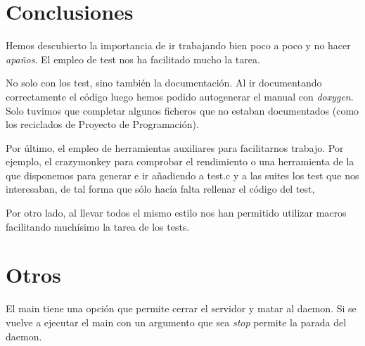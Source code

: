\documentclass[nochap]{apuntes}
\begin{document}
\section{Conclusiones}

Hemos descubierto la importancia de ir trabajando bien poco a poco y no hacer \textit{apaños}. El empleo de test nos ha facilitado mucho la tarea. 

No solo con los test, sino también la documentación. Al ir documentando correctamente el código luego hemos podido autogenerar el manual con \textit{doxygen}. Solo tuvimos que completar algunos ficheros que no estaban documentados (como los reciclados de Proyecto de Programación).

Por último, el empleo de herramientas auxiliares para facilitarnos trabajo. Por ejemplo, el crazymonkey para comprobar el rendimiento o una herramienta de la que disponemos para generar e ir añadiendo a test.c y a las suites los test que nos interesaban, de tal forma que sólo hacía falta rellenar el código del test, 

Por otro lado, al llevar todos el mismo estilo nos han permitido utilizar macros facilitando muchísimo la tarea de los tests.

\section{Otros}

El main tiene una opción que permite cerrar el servidor y matar al daemon. Si se vuelve a ejecutar el main con un argumento que sea \textit{stop} permite la parada del daemon.
\end{document}
